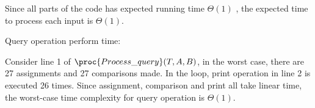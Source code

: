\documentclass[11pt, answers]{exam}
\theoremstyle{plain}
\theoremstyle{definition}
\begin{document}
\begin{questions}
\begin{solution}
\begin{enumerate}
Since all parts of the code has expected running time $\Theta{(1)}$ , the expected time to process each input is $\Theta{(1)}$.

Query operation perform time:

Consider line 1 of $\proc{Process\_query}(T, A, B)$, in the worst case, there are 27 assignments and 27 comparisons made. In the loop, print operation in line 2 is executed 26 times. Since assignment, comparison and print all take linear time, the worst-case time complexity for query operation is $\Theta{(1)}$.
\end{enumerate}
\end{solution}

\end{questions}
\end{document}
